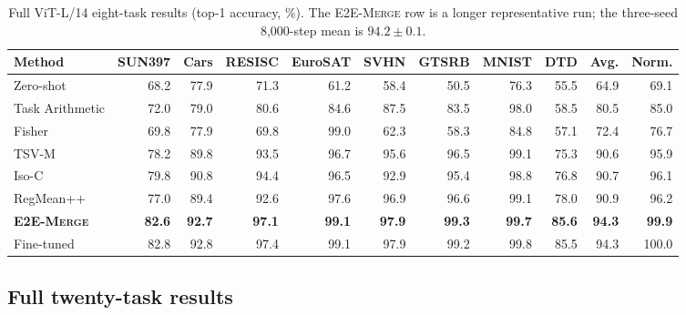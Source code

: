 \documentclass[letterpaper]{article} %
\newcommand{\method}{\textup{\textsc{E2E-Merge}}\xspace}
\theoremstyle{plain}
\theoremstyle{definition}
\begin{document}
\begin{table}[tb]
\centering
{\small
\begin{tabular*}{\textwidth}{@{\extracolsep{\fill}}lrrrrrrrrrr}
\toprule
Method & SUN397 & Cars & RESISC & EuroSAT & SVHN & GTSRB & MNIST & DTD & Avg. & Norm. \\
\midrule
Zero-shot & 68.2 & 77.9 & 71.3 & 61.2 & 58.4 & 50.5 & 76.3 & 55.5 & 64.9 & 69.1 \\
Task Arithmetic & 72.0 & 79.0 & 80.6 & 84.6 & 87.5 & 83.5 & 98.0 & 58.5 & 80.5 & 85.0 \\
Fisher & 69.8 & 77.9 & 69.8 & 99.0 & 62.3 & 58.3 & 84.8 & 57.1 & 72.4 & 76.7 \\
TSV-M & 78.2 & 89.8 & 93.5 & 96.7 & 95.6 & 96.5 & 99.1 & 75.3 & 90.6 & 95.9 \\
Iso-C & 79.8 & 90.8 & 94.4 & 96.5 & 92.9 & 95.4 & 98.8 & 76.8 & 90.7 & 96.1 \\
RegMean++ & 77.0 & 89.4 & 92.6 & 97.6 & 96.9 & 96.6 & 99.1 & 78.0 & 90.9 & 96.2 \\
\textbf{\method} & \textbf{82.6} & \textbf{92.7} & \textbf{97.1} & \textbf{99.1} & \textbf{97.9} & \textbf{99.3} & \textbf{99.7} & \textbf{85.6} & \textbf{94.3} & \textbf{99.9} \\
\midrule
Fine-tuned & 82.8 & 92.8 & 97.4 & 99.1 & 97.9 & 99.2 & 99.8 & 85.5 & 94.3 & 100.0 \\
\bottomrule
\end{tabular*}
}
\caption{Full ViT-L/14 eight-task results (top-1 accuracy, \%). The \method row is a
longer representative run; the three-seed 8,000-step mean is $94.2\pm0.1$.}
\label{tab:l14-full}
\end{table}

\subsection{Full twenty-task results}
\label{app:tall20-full}
\end{document}
